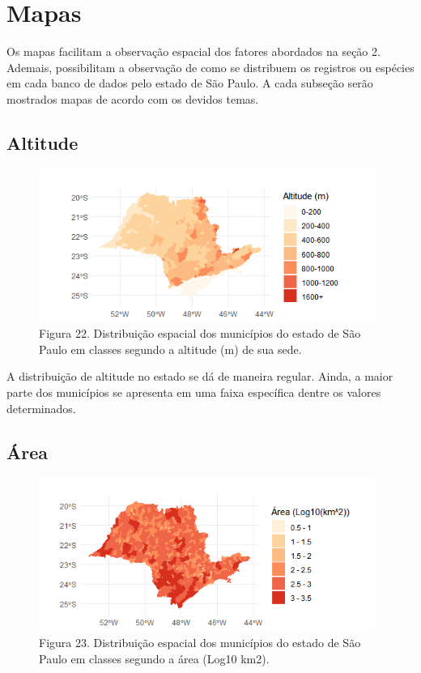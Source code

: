 \section{Mapas}

\hrulefill


\hrulefill

\begin{resposta}
Os mapas facilitam a observação espacial dos fatores abordados na seção 2. Ademais, possibilitam a observação de como se distribuem os registros ou espécies em cada banco de dados pelo estado de São Paulo. A cada subseção serão mostrados mapas de acordo com os devidos temas.
\end{resposta}

\subsection{Altitude}

\begin{figure}[h!]
\centering
\includegraphics[height = 5cm]{Imagens/M01.png}
\\{\scriptsize Figura 22. Distribuição espacial dos municípios do estado de São Paulo em classes segundo a altitude (m) de sua sede.}
\end{figure}

\begin{resposta}
A distribuição de altitude no estado se dá de maneira regular. Ainda, a maior parte dos municípios se apresenta em uma faixa específica dentre os valores determinados.
\end{resposta}

\subsection {Área}

\begin{figure}[h!]
\centering
\includegraphics[height = 5cm]{Imagens/M02.png}
\\{\scriptsize Figura 23. Distribuição espacial dos municípios do estado de São Paulo em classes segundo a área (Log10 km2).}
\end{figure}

